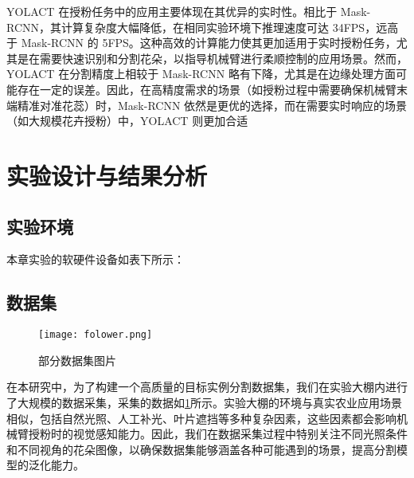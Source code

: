 YOLACT 在授粉任务中的应用主要体现在其优异的实时性。相比于 Mask-RCNN，其计算复杂度大幅降低，在相同实验环境下推理速度可达 34FPS，远高于 Mask-RCNN 的 5FPS。这种高效的计算能力使其更加适用于实时授粉任务，尤其是在需要快速识别和分割花朵，以指导机械臂进行柔顺控制的应用场景。然而，YOLACT 在分割精度上相较于 Mask-RCNN 略有下降，尤其是在边缘处理方面可能存在一定的误差。因此，在高精度需求的场景（如授粉过程中需要确保机械臂末端精准对准花蕊）时，Mask-RCNN 依然是更优的选择，而在需要实时响应的场景（如大规模花卉授粉）中，YOLACT 则更加合适


\section{实验设计与结果分析}
\subsection{实验环境}
本章实验的软硬件设备如表下所示：
\begin{table}[htbp]
	\caption[目标分割实验环境]{目标分割实验环境}
	\label{tab:division-of-microchannels}
\end{table}
\subsection{数据集} 


 \begin{figure}[htb]
	\texttt{[image: folower.png]}
	\caption[部分数据集图片]{部分数据集图片} %
	\label{fig:folower.drawio}
\end{figure}
在本研究中，为了构建一个高质量的目标实例分割数据集，我们在实验大棚内进行了大规模的数据采集，采集的数据如\cref{fig:folower.drawio}所示。实验大棚的环境与真实农业应用场景相似，包括自然光照、人工补光、叶片遮挡等多种复杂因素，这些因素都会影响机械臂授粉时的视觉感知能力。因此，我们在数据采集过程中特别关注不同光照条件和不同视角的花朵图像，以确保数据集能够涵盖各种可能遇到的场景，提高分割模型的泛化能力。

